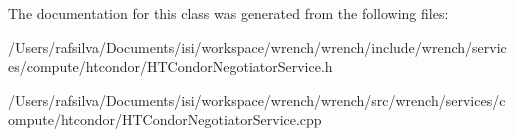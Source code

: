 The documentation for this class was generated from the following files\+:\begin{DoxyCompactItemize}
\item 
/\+Users/rafsilva/\+Documents/isi/workspace/wrench/wrench/include/wrench/services/compute/htcondor/H\+T\+Condor\+Negotiator\+Service.\+h\item 
/\+Users/rafsilva/\+Documents/isi/workspace/wrench/wrench/src/wrench/services/compute/htcondor/H\+T\+Condor\+Negotiator\+Service.\+cpp\end{DoxyCompactItemize}
